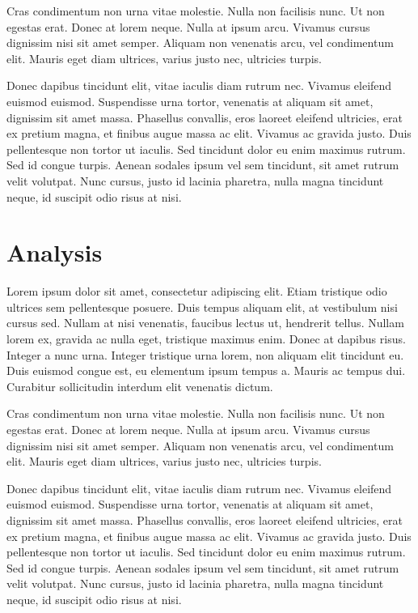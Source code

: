 \documentclass[11pt, a4paper]{resources/JTH}
\begin{document}
Cras condimentum non urna vitae molestie. Nulla non facilisis nunc. Ut non egestas erat. Donec at lorem neque. Nulla at ipsum arcu. Vivamus cursus dignissim nisi sit amet semper. Aliquam non venenatis arcu, vel condimentum elit. Mauris eget diam ultrices, varius justo nec, ultricies turpis.

Donec dapibus tincidunt elit, vitae iaculis diam rutrum nec. Vivamus eleifend euismod euismod. Suspendisse urna tortor, venenatis at aliquam sit amet, dignissim sit amet massa. Phasellus convallis, eros laoreet eleifend ultricies, erat ex pretium magna, et finibus augue massa ac elit. Vivamus ac gravida justo. Duis pellentesque non tortor ut iaculis. Sed tincidunt dolor eu enim maximus rutrum. Sed id congue turpis. Aenean sodales ipsum vel sem tincidunt, sit amet rutrum velit volutpat. Nunc cursus, justo id lacinia pharetra, nulla magna tincidunt neque, id suscipit odio risus at nisi.

\section{Analysis}
\label{chap:Analysis}

Lorem ipsum dolor sit amet, consectetur adipiscing elit. Etiam tristique odio ultrices sem pellentesque posuere. Duis tempus aliquam elit, at vestibulum nisi cursus sed. Nullam at nisi venenatis, faucibus lectus ut, hendrerit tellus. Nullam lorem ex, gravida ac nulla eget, tristique maximus enim. Donec at dapibus risus. Integer a nunc urna. Integer tristique urna lorem, non aliquam elit tincidunt eu. Duis euismod congue est, eu elementum ipsum tempus a. Mauris ac tempus dui. Curabitur sollicitudin interdum elit venenatis dictum.

Cras condimentum non urna vitae molestie. Nulla non facilisis nunc. Ut non egestas erat. Donec at lorem neque. Nulla at ipsum arcu. Vivamus cursus dignissim nisi sit amet semper. Aliquam non venenatis arcu, vel condimentum elit. Mauris eget diam ultrices, varius justo nec, ultricies turpis.

Donec dapibus tincidunt elit, vitae iaculis diam rutrum nec. Vivamus eleifend euismod euismod. Suspendisse urna tortor, venenatis at aliquam sit amet, dignissim sit amet massa. Phasellus convallis, eros laoreet eleifend ultricies, erat ex pretium magna, et finibus augue massa ac elit. Vivamus ac gravida justo. Duis pellentesque non tortor ut iaculis. Sed tincidunt dolor eu enim maximus rutrum. Sed id congue turpis. Aenean sodales ipsum vel sem tincidunt, sit amet rutrum velit volutpat. Nunc cursus, justo id lacinia pharetra, nulla magna tincidunt neque, id suscipit odio risus at nisi.
\end{document}
